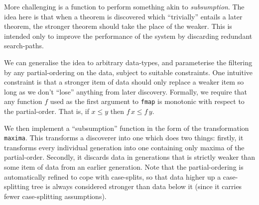 More challenging is a function to perform something akin to \emph{subsumption}. The idea here is that when a theorem is discovered which ``trivially'' entails a later theorem, the stronger theorem should take the place of the weaker. This is intended only to improve the performance of the system by discarding redundant search-paths. 

We can generalise the idea to arbitrary data-types, and parameterise the filtering by any partial-ordering on the data, subject to suitable constraints. One intuitive constraint is that a stronger item of data should only replace a weaker item so long as we don't ``lose'' anything from later discovery. Formally, we require that any function $f$ used as the first argument to \texttt{fmap} is monotonic with respect to the partial-order. That is, if $x \leq y$ then $f\,x \leq f\,y$. 

We then implement a ``subsumption'' function in the form of the transformation \texttt{maxima}. This transforms a discoverer into one which does two things: firstly, it transforms every individual generation into one containing only maxima of the partial-order. Secondly, it discards data in generations that is strictly weaker than some item of data from an earlier generation. Note that the partial-ordering is automatically refined to cope with case-splits, so that data higher up a case-splitting tree is always considered stronger than data below it (since it carries fewer case-splitting assumptions).




